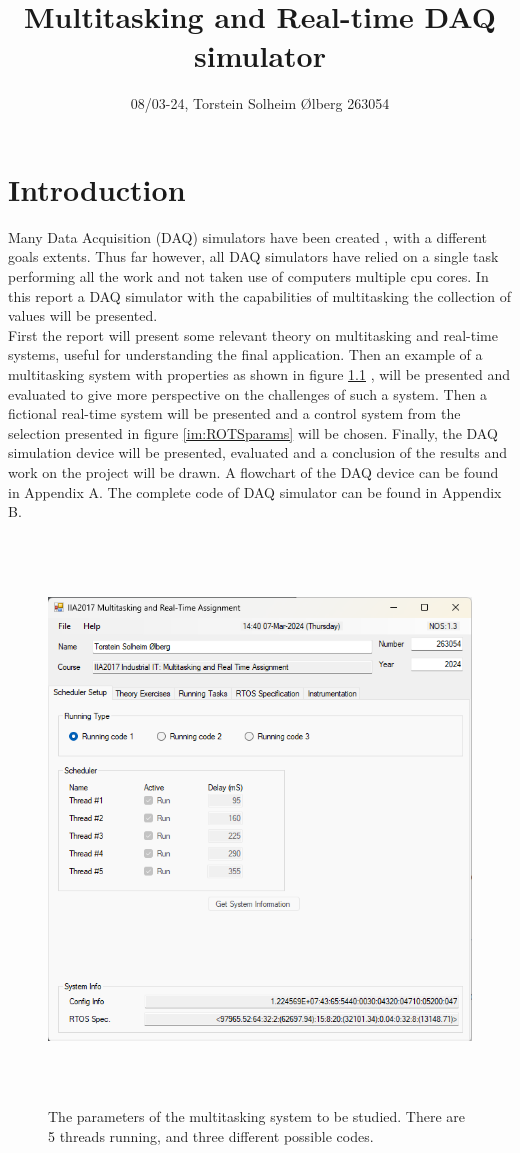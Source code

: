 \documentclass[12pt, A4paper, english]{book}
\author{08/03-24, Torstein Solheim Ølberg 263054}
\title{Multitasking and Real-time DAQ simulator}
\date{}
\begin{document}
\maketitle
\tableofcontents

	\chapter{Introduction}
\label{sec:Intro}
Many Data Acquisition (DAQ) simulators have been created \cite{a1}\cite{a2}\cite{a3}, with a different goals extents. Thus far however, all DAQ simulators have relied on a single task performing all the work and not taken use of computers multiple cpu cores. In this report a DAQ simulator with the capabilities of multitasking the collection of values will be presented. \\
First the report will present some relevant theory on multitasking and real-time systems, useful for understanding the final application. Then an example of a multitasking system with properties as shown in figure \ref{im:params} \cite{app}, will be presented and evaluated to give more perspective on the challenges of such a system. Then a fictional real-time system will be presented and a control system from the selection presented in figure \ref{im:ROTSparams} will be chosen. Finally, the DAQ simulation device will be presented, evaluated and a conclusion of the results and work on the project will be drawn. A flowchart of the DAQ device can be found in Appendix A. The complete code of DAQ simulator can be found in Appendix B.
		\begin{figure}[H]
\includegraphics[width=\linewidth, height=15cm]{Parameters_1.png}
\caption{The parameters of the multitasking system to be studied. There are 5 threads running, and three different possible codes.}
\label{im:params}
		\end{figure}
	
\end{document}
